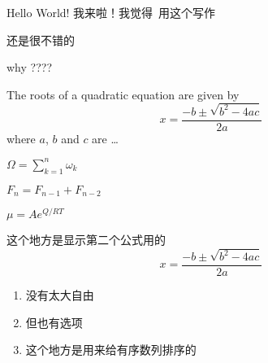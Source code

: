 \documentclass{article}
\begin{document}
	\begin{CJK*}{UTF8}{gbsn}
		Hello World! 我来啦！我觉得\ 用这个写作\par
		还是很不错的\par
		why ???? \par
		
		The roots of a quadratic equation
		are given by
		\begin{equation}
		x = \frac{-b \pm \sqrt{b^2 - 4ac}}
		{2a}
		\end{equation}
		where $a$, $b$ and $c$ are \ldots
		
		$\Omega = \sum_{k=1}^{n} \omega_k$\par
		
		$F_n = F_{n-1} + F_{n-2}$ %
		
		
		$\mu = A e^{Q/RT}$
		
		这个地方是显示第二个公式用的
		\begin{equation}
		x = \frac{-b \pm \sqrt{b^2 - 4ac}}
		{2a}
		\end{equation}
		
		
		\begin{enumerate} %
			\item 没有太大自由
			\item 但也有选项
			\item 这个地方是用来给有序数列排序的 %
		\end{enumerate}
	
		
		\clearpage\end{CJK*}
\end{document}
